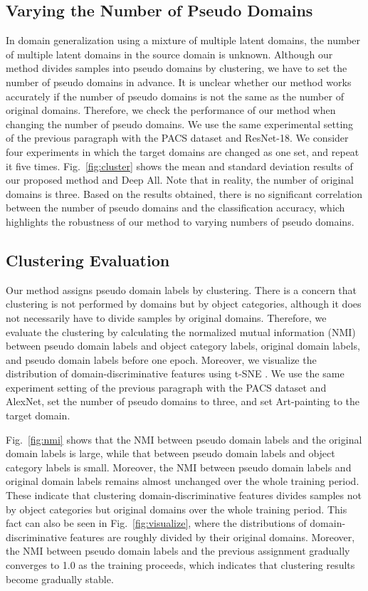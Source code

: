 \documentclass[letterpaper]{article} \usepackage{aaai20}  \usepackage{times}  \usepackage{helvet} \usepackage{courier}  \usepackage[hyphens]{url}  \usepackage{graphicx} \urlstyle{rm} \def\UrlFont{\rm}  \usepackage{graphicx}  \usepackage[whole]{bxcjkjatype}
\begin{document}
\subsection{Varying the Number of Pseudo Domains}
In domain generalization using a mixture of multiple latent domains, the number of multiple latent domains in the source domain is unknown. 
Although our method divides samples into  pseudo domains by clustering, we have to set the number of pseudo domains in advance. It is unclear whether our method works accurately if the number of pseudo domains is not the same as the number of original domains.
Therefore, we check the performance of our method when changing the number of pseudo domains. We use the same experimental setting of the previous paragraph with the PACS dataset and ResNet-18. We consider four experiments in which the target domains are changed as one set, and repeat it five times.
Fig.~\ref{fig:cluster} shows the mean and standard deviation results of our proposed method and Deep All. Note that in reality, the number of original domains is three. Based on the results obtained, there is no significant correlation between the number of pseudo domains and the classification accuracy, which highlights the robustness of our method to varying numbers of pseudo domains.

\subsection{Clustering Evaluation}
Our method assigns pseudo domain labels by clustering. There is a concern that clustering is not performed by domains but by object categories, although it does not necessarily have to divide samples by original domains.
Therefore, we evaluate the clustering by calculating the normalized mutual information (NMI) between pseudo domain labels and object category labels, original domain labels, and pseudo domain labels before one epoch. Moreover, we visualize the distribution of domain-discriminative features using t-SNE \cite{t_SNE}. We use the same experiment setting of the previous paragraph with the PACS dataset and AlexNet, set the number of pseudo domains to three, and set Art-painting to the target domain.\par
Fig.~\ref{fig:nmi} shows that the NMI between pseudo domain labels and the original domain labels is large, while that between pseudo domain labels and object category labels is small. Moreover, the NMI between pseudo domain labels and original domain labels remains almost unchanged over the whole training period. These indicate that clustering domain-discriminative features divides samples not by object categories but original domains over the whole training period. This fact can also be seen in Fig.~\ref{fig:visualize}, where the distributions of domain-discriminative features are roughly divided by their original domains. Moreover, the NMI between pseudo domain labels and the previous assignment gradually converges to 1.0 as the training proceeds, which indicates that clustering results become gradually stable.
\end{document}
